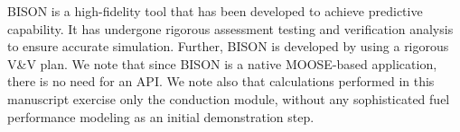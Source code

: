 BISON is a high-fidelity tool that has been developed to achieve predictive capability. It has undergone
rigorous assessment testing and verification analysis to ensure accurate simulation. Further, BISON is
developed by using a rigorous V\&V plan. We note that since BISON is a native MOOSE-based application, there is no need for an API. We note also that calculations performed in this manuscript exercise only the conduction module, without any sophisticated fuel performance modeling as an initial demonstration step.
